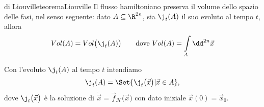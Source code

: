 \begin{teor}{di Liouville}{teoremaLiouville}
	Il flusso hamiltoniano preserva il volume dello spazio delle fasi, nel senso seguente:
	dato \(A\subseteq \R^{2n}\), sia \(\j_t(A)\) il suo evoluto al tempo \(t\), allora
	\[
		Vol(A) = Vol\big(\j_t(A)\big) \qquad\text{dove }Vol(A) = \int\limits_A \dd^{2n}\vec{x}
	\]
\end{teor}

\begin{notz}
	Con l'evoluto \(\j_t(A)\) al tempo \(t\) intendiamo
	\[
		\j_t(A) = \Set{\j_t\big(\vec{x}\big) | \vec{x} \in A},
	\]
	dove \(\j_t\big(\vec{x}\big)\) è la soluzione di \(\dot{\vec{x}}=\vec{f}_{\mathcal{H}}\big(\vec{x}\big)\) con dato iniziale \(\vec{x}(0)=\vec{x}_0\).
\end{notz}

